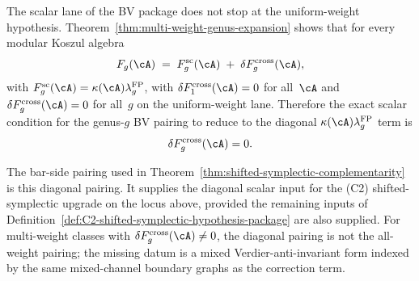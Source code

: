 \begin{remark}
The scalar lane of the BV package does not stop at the
uniform-weight hypothesis. Theorem~\ref{thm:multi-weight-genus-expansion}
shows that for every modular Koszul algebra
\[
F_g(\cA)
\;=\;
F_g^{\mathrm{sc}}(\cA)
\;+\;
\delta F_g^{\mathrm{cross}}(\cA),
\]
with \(F_g^{\mathrm{sc}}(\cA)=
\kappa(\cA)\lambda_g^{\mathrm{FP}}\),
with $\delta F_1^{\mathrm{cross}}(\cA)=0$ for all~$\cA$ and
$\delta F_g^{\mathrm{cross}}(\cA)=0$ for all~$g$ on the
uniform-weight lane. Therefore the exact scalar condition for the
genus-$g$ BV pairing to reduce to the diagonal
$\kappa(\cA)\lambda_g^{\mathrm{FP}}$ term is
\[
\delta F_g^{\mathrm{cross}}(\cA)=0.
\]

The bar-side pairing used in
Theorem~\ref{thm:shifted-symplectic-complementarity} is this diagonal
pairing. It supplies the diagonal scalar input for the
\textup{(C2)} shifted-symplectic upgrade on the locus above, provided
the remaining inputs of
Definition~\ref{def:C2-shifted-symplectic-hypothesis-package} are also
supplied. For multi-weight classes with
$\delta F_g^{\mathrm{cross}}(\cA)\neq0$, the diagonal pairing is not
the all-weight pairing; the missing datum is a mixed
Verdier-anti-invariant form indexed by the same mixed-channel boundary
graphs as the correction term.
\end{remark}

